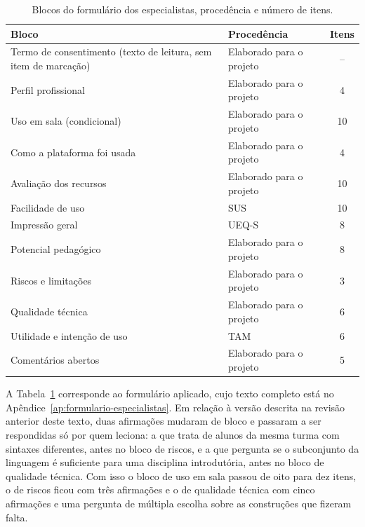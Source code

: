 \begin{table}[htbp]
\centering
\caption{Blocos do formulário dos especialistas, procedência e número de itens.}
\label{tab:blocos-pa01}
\footnotesize
\renewcommand{\arraystretch}{1.2}
\begin{tabular}{|p{5.2cm}|p{4.6cm}|c|}
\hline
\textbf{Bloco} & \textbf{Procedência} & \textbf{Itens} \\\hline
Termo de consentimento (texto de leitura, sem item de marcação) & Elaborado para o projeto & -- \\\hline
Perfil profissional & Elaborado para o projeto & 4 \\\hline
Uso em sala (condicional) & Elaborado para o projeto & 10 \\\hline
Como a plataforma foi usada & Elaborado para o projeto & 4 \\\hline
Avaliação dos recursos & Elaborado para o projeto & 10 \\\hline
Facilidade de uso & SUS \cite{brooke1996} & 10 \\\hline
Impressão geral & UEQ-S \cite{schrepp2017} & 8 \\\hline
Potencial pedagógico & Elaborado para o projeto & 8 \\\hline
Riscos e limitações & Elaborado para o projeto & 3 \\\hline
Qualidade técnica & Elaborado para o projeto & 6 \\\hline
Utilidade e intenção de uso & TAM \cite{davis1989} & 6 \\\hline
Comentários abertos & Elaborado para o projeto & 5 \\\hline
\end{tabular}
\end{table}

A Tabela~\ref{tab:blocos-pa01} corresponde ao formulário aplicado, cujo texto completo está no Apêndice~\ref{ap:formulario-especialistas}. Em relação à versão descrita na revisão anterior deste texto, duas afirmações mudaram de bloco e passaram a ser respondidas só por quem leciona: a que trata de alunos da mesma turma com sintaxes diferentes, antes no bloco de riscos, e a que pergunta se o subconjunto da linguagem é suficiente para uma disciplina introdutória, antes no bloco de qualidade técnica. Com isso o bloco de uso em sala passou de oito para dez itens, o de riscos ficou com três afirmações e o de qualidade técnica com cinco afirmações e uma pergunta de múltipla escolha sobre as construções que fizeram falta.

